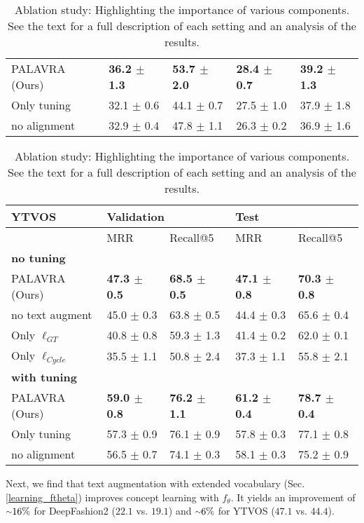 \documentclass[runningheads]{llncs}
\newcommand{\tildeapprox}{{\raise.17ex\hbox{$\scriptstyle\sim$}}}
\newcommand{\secref}[1]{Sec. \ref{#1}}
\newcommand{\ftheta}{f_\theta}
\begin{document}
\begin{table}[t]
\begin{tabular}{l|ll|ll}
    PALAVRA (Ours)  &  \textbf{36.2 $\pm$ 1.3} & \textbf{53.7 $\pm$ 2.0}  & \textbf{28.4 $\pm$ 0.7} & \textbf{39.2 $\pm$ 1.3} \\
    Only tuning  &  32.1 $\pm$ 0.6 &  44.1 $\pm$ 0.7 &  27.5 $\pm$ 1.0 &  37.9 $\pm$ 1.8 \\
    no alignment  &  32.9 $\pm$ 0.4 &  47.8 $\pm$ 1.1 &  26.3 $\pm$ 0.2 &  36.9 $\pm$ 1.6 \\
    \bottomrule
\end{tabular}
\vspace{10pt}
\begin{tabular}{l|ll|ll}
    \toprule
        {YTVOS} &    \multicolumn{2}{l|}{Validation}       &    \multicolumn{2}{l}{Test} \\
    \midrule
    {} &       MRR &  Recall@5 &    MRR & Recall@5 \\
    \midrule
     {\textbf{no tuning}} &&\\
    PALAVRA (Ours)  &  \textbf{47.3 $\pm$ 0.5} &  \textbf{68.5 $\pm$ 0.5} &  \textbf{47.1 $\pm$ 0.8} &  \textbf{70.3 $\pm$ 0.8 }\\
    no text augment  &  45.0 $\pm$ 0.3 &  63.8 $\pm$ 0.5 &  44.4 $\pm$ 0.3 &  65.6 $\pm$ 0.4 \\
    Only $\ell_{GT}$ &  40.8 $\pm$ 0.8 &  59.3 $\pm$ 1.3 &  41.4 $\pm$ 0.2 &  62.0 $\pm$ 0.1 \\
    Only $\ell_{Cycle}$    &  35.5 $\pm$ 1.1 &  50.8 $\pm$ 2.4 &  37.3 $\pm$ 1.1 &  55.8 $\pm$ 2.1 \\
    \midrule
   {\textbf{with tuning}} &&\\
    PALAVRA (Ours)   &  \textbf{59.0 $\pm$ 0.8} &  \textbf{76.2 $\pm$ 1.1} &  \textbf{61.2 $\pm$ 0.4} &  \textbf{78.7 $\pm$ 0.4} \\
    Only tuning   &  57.3 $\pm$ 0.9 &  76.1 $\pm$ 0.9 &  57.8 $\pm$ 0.3 &  77.1 $\pm$ 0.8 \\
    no alignment &  56.5 $\pm$ 0.7 &  74.1 $\pm$ 0.3 &  58.1 $\pm$ 0.3 &  75.2 $\pm$ 0.9 \\
    \bottomrule
    \end{tabular}
    \caption{Ablation study: Highlighting the importance of various components. See the text for a full description of each setting and an analysis of the results. 
    }
    \label{tab:deep_fashion_abl}
    \vspace{-20pt}
\end{table}

Next, we find that text augmentation with extended vocabulary (\secref{learning_ftheta}) improves concept learning with $\ftheta$. It yields an improvement of $\tildeapprox 16\%$ for DeepFashion2 ($22.1$ vs. $19.1$) and $\tildeapprox 6\%$ for YTVOS ($47.1$ vs. $44.4$).
\end{document}

